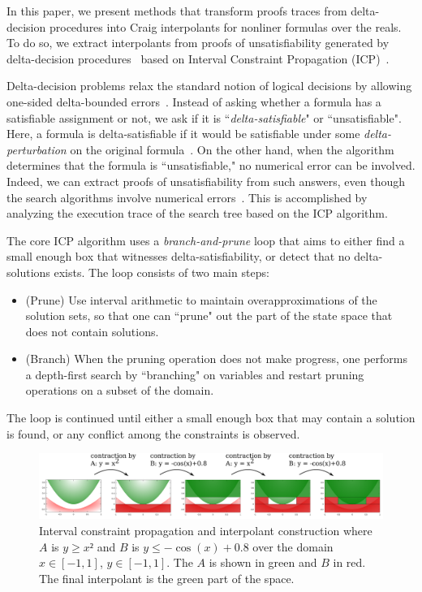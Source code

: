 In this paper, we present methods that transform proofs traces from delta-decision procedures into Craig interpolants for nonliner formulas over the reals. To do so, we extract interpolants from proofs of unsatisfiability generated by delta-decision procedures~\cite{DBLP:conf/synasc/GaoKC14} based on Interval Constraint Propagation (ICP)~\cite{}. 

Delta-decision problems relax the standard notion of logical decisions by allowing one-sided delta-bounded errors~\cite{DBLP:conf/lics/GaoAC12,DBLP:conf/cade/GaoAC12}. Instead of asking whether a formula has a satisfiable assignment or not, we ask if it is ``{\em delta-satisfiable}" or ``unsatisfiable". Here, a formula is delta-satisfiable if it would be satisfiable under some {\em delta-perturbation} on the original formula~\cite{DBLP:conf/cade/GaoAC12}. On the other hand, when the algorithm determines that the formula is ``unsatisfiable," no numerical error can be involved. Indeed, we can extract proofs of unsatisfiability from such answers, even though the search algorithms involve numerical errors~\cite{DBLP:conf/synasc/GaoKC14}. This is accomplished by analyzing the execution trace of the search tree based on the ICP algorithm. 


The core ICP algorithm uses a {\em branch-and-prune} loop that aims to either find a small enough box that witnesses delta-satisfiability, or detect that no delta-solutions exists. The loop consists of two main steps:
\begin{itemize}
\item (Prune) Use interval arithmetic to maintain overapproximations of the solution sets, so that one can ``prune" out the part of the state space that does not contain solutions.
\item (Branch) When the pruning operation does not make progress, one performs a depth-first search by ``branching" on variables and restart pruning operations on a subset of the domain. 
\end{itemize}
The loop is continued until either a small enough box that may contain a solution is found, or any conflict among the constraints is observed.

\begin{figure}
\centering
\includegraphics[scale=0.04]{img/example.pdf}
\caption{
    Interval constraint propagation and interpolant construction where $A$ is $y≥x²$ and $B$ is $y ≤ -\cos(x) + 0.8$ over the domain $x∈[-1,1]$, $y∈[-1,1]$.
    The $A$ is shown in green and $B$ in red.
    The final interpolant is the green part of the space.
}
\label{fig:example}
\end{figure}


